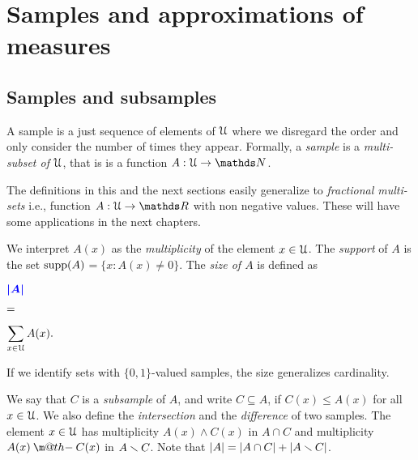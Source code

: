 \documentclass[sputnik.tex]{subfiles}
\begin{document}
\def\Fr{\mathop{\rm Fr}}

\def\vc{{\footnotesize VC}}
\def\nip{{\footnotesize NIP}}


\def\medrel#1{\parbox[t]{6ex}{$\displaystyle\hfil #1$}}
\def\ceq#1#2#3{\parbox[t]{25ex}{$\displaystyle #1$}\medrel{#2}{$\displaystyle #3$}}



\chapter{Samples and approximations of measures}


\section{Samples and subsamples}\label{multisets}

\def\ceq#1#2#3{\parbox[t]{32ex}{$\displaystyle #1$}\parbox{5ex}{$\displaystyle\hfil #2$}{$\displaystyle #3$}}

A sample is a just sequence of elements of $\EuScript U$ where we disregard the order and only consider the number of times they appear.
Formally, a \emph{sample\/} is a \emph{multi-subset of $\EuScript U$}, that is is a function $A:\U\to\NN$. 

The definitions in this and the next sections easily generalize to \emph{fractional multi-sets\/} i.e.,  function $A:\U\to\RR$ with non negative values.
These will have some applications in the next chapters.

We interpret $A(x)$ as the \emph{multiplicity\/} of the element $x\in\EuScript U$.
The \emph{support\/} of $A$ is the set \emph{$\mathop{\rm supp}(A)$}$=\{x:A(x)\neq0\}$.
The \emph{size of $A$\/} is defined as

\ceq{\hfill\emph{$|A|$}}{=}{\sum_{x\in\U} A(x).}

If we identify sets with $\{0,1\}$-valued samples, the size generalizes cardinality. 

\makeatletter
\def\dotminus{\mathbin{\ooalign{\hidewidth\raise1ex\hbox{.}\hidewidth\cr$\m@th-$\cr}}}
\makeatother

We say that $C$ is a \emph{subsample\/} of $A$, and write \emph{$C\subseteq A$}, if $C(x)\le A(x)$ for all $x\in\EuScript U$.
We also define the \emph{intersection\/} and the \emph{difference\/} of two samples.
The element $x\in\EuScript U$ has multiplicity  $A(x)\wedge C(x)$ in \emph{$A\cap C$\/} and multiplicity  $A(x)\dotminus C(x)$ in \emph{$A\smallsetminus C$}.
Note that $|A|=|A\cap C|+|A\smallsetminus C|$.
\end{document}
